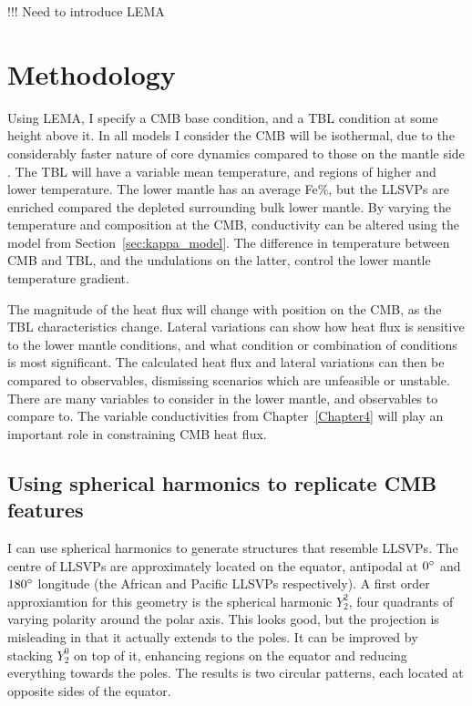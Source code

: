 !!! Need to introduce LEMA



\section{Methodology}

Using LEMA, I specify a CMB base condition, and a TBL condition at some height above it. In all models I consider the CMB will be isothermal, due to the considerably faster nature of core dynamics compared to those on the mantle side \citep[e.g.][]{Gibbons2000}. The TBL will have a variable mean temperature, and regions of higher and lower temperature. The lower mantle has an average Fe\%, but the LLSVPs are enriched compared the depleted surrounding bulk lower mantle. By varying the temperature and composition at the CMB, conductivity can be altered using the model from Section~\ref{sec:kappa_model}. The difference in temperature between CMB and TBL, and the undulations on the latter, control the lower mantle temperature gradient. 

The magnitude of the heat flux will change with position on the CMB, as the TBL characteristics change. Lateral variations can show how heat flux is sensitive to the lower mantle conditions, and what condition or combination of conditions is most significant. The calculated heat flux and lateral variations can then be compared to observables, dismissing scenarios which are unfeasible or unstable. There are many variables to consider in the lower mantle, and observables to compare to. The variable conductivities from Chapter~\ref{Chapter4} will play an important role in constraining CMB heat flux.

\subsection{Using spherical harmonics to replicate CMB features}

I can use spherical harmonics to generate structures that resemble LLSVPs. The centre of LLSVPs are approximately located on the equator, antipodal at $0^{\circ}$ and $180^{\circ}$ longitude (the African and Pacific LLSVPs respectively). A first order approxiamtion for this geometry is the spherical harmonic $Y^{2}_{2}$, four quadrants of varying polarity around the polar axis. This looks good, but the projection is misleading in that it actually extends to the poles. It can be improved by stacking $Y^{0}_{2}$ on top of it, enhancing regions on the equator and reducing everything towards the poles. The results is two circular patterns, each located at opposite sides of the equator.

